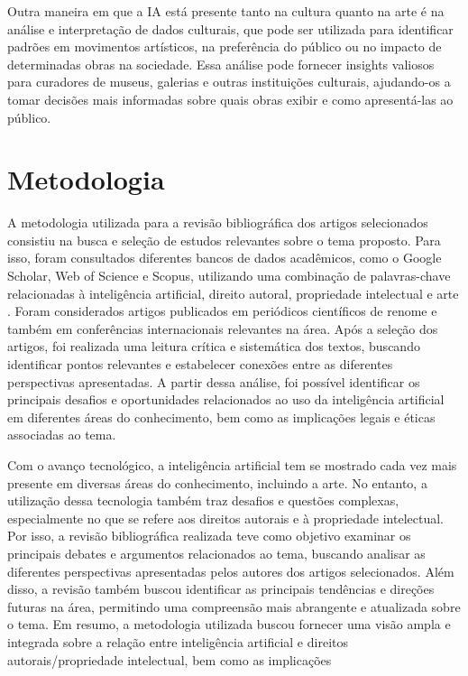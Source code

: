 \documentclass[12pt]{article}
\begin{document}
    Outra maneira em que a IA está presente tanto na cultura quanto na arte é na análise e interpretação de dados culturais, que pode ser utilizada para identificar padrões em movimentos artísticos, na preferência do público ou no impacto de determinadas obras na sociedade. Essa análise pode fornecer insights valiosos para curadores de museus, galerias e outras instituições culturais, ajudando-os a tomar decisões mais informadas sobre quais obras exibir e como apresentá-las ao público.

	\section{Metodologia}
	\label{sec:fund_teorica}
	
	A metodologia utilizada para a revisão bibliográfica dos artigos selecionados consistiu na busca e seleção de estudos relevantes sobre o tema proposto. Para isso, foram consultados diferentes bancos de dados acadêmicos, como o Google Scholar, Web of Science e Scopus, utilizando uma combinação de palavras-chave relacionadas à inteligência artificial, direito autoral, propriedade intelectual e arte . Foram considerados artigos publicados em periódicos científicos de renome e também em conferências internacionais relevantes na área. Após a seleção dos artigos, foi realizada uma leitura crítica e sistemática dos textos, buscando identificar pontos relevantes e estabelecer conexões entre as diferentes perspectivas apresentadas. A partir dessa análise, foi possível identificar os principais desafios e oportunidades relacionados ao uso da inteligência artificial em diferentes áreas do conhecimento, bem como as implicações legais e éticas associadas ao tema.
    
    Com o avanço tecnológico, a inteligência artificial tem se mostrado cada vez mais presente em diversas áreas do conhecimento, incluindo a arte. No entanto, a utilização dessa tecnologia também traz desafios e questões complexas, especialmente no que se refere aos direitos autorais e à propriedade intelectual. Por isso, a revisão bibliográfica realizada teve como objetivo examinar os principais debates e argumentos relacionados ao tema, buscando analisar as diferentes perspectivas apresentadas pelos autores dos artigos selecionados. Além disso, a revisão também buscou identificar as principais tendências e direções futuras na área, permitindo uma compreensão mais abrangente e atualizada sobre o tema. Em resumo, a metodologia utilizada buscou fornecer uma visão ampla e integrada sobre a relação entre inteligência artificial e direitos autorais/propriedade intelectual, bem como as implicações 
\end{document}
